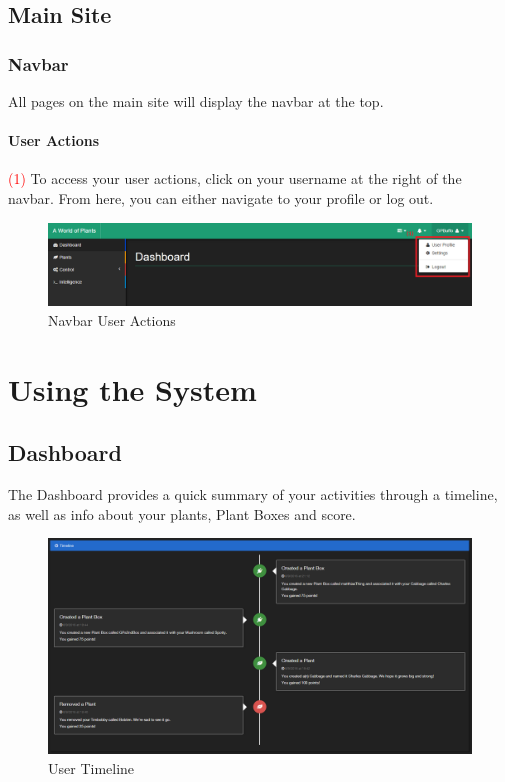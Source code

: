 \documentclass{article}
\begin{document}
\subsection{Main Site}
	\subsubsection{Navbar}
	All pages on the main site will display the navbar at the top.
		\paragraph{User Actions}
		\textcolor{red}{(1)} To access your user actions, click on your username at the right of the navbar. From here, you can either navigate to your profile or log out.
		\begin{figure}[H]
			\includegraphics[width=\textwidth]{../images/UserManual/navbar-user-actions.PNG}
			\caption{Navbar User Actions}
		\end{figure}

\section{Using the System}
	\subsection{Dashboard}
	The Dashboard provides a quick summary of your activities through a timeline, as well as info about your plants, Plant Boxes and score.
	\begin{figure}[H]
		\includegraphics[width=\textwidth]{../images/UserManual/timeline.png}
		\caption{User Timeline}
	\end{figure}
	
\end{document}
